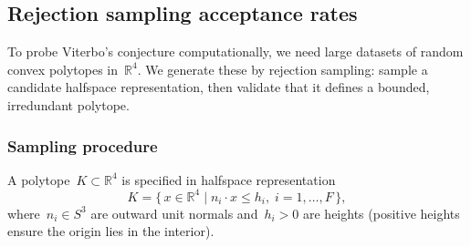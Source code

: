 %
%
%

\subsection{Rejection sampling acceptance rates}
\label{sec:rejection-sampling}

To probe Viterbo's conjecture computationally, we need large datasets of
random convex polytopes in~$\mathbb{R}^4$. We generate these by rejection
sampling: sample a candidate halfspace representation, then validate that it
defines a bounded, irredundant polytope.

\subsubsection*{Sampling procedure}

A polytope~$K \subset \mathbb{R}^4$ is specified in halfspace representation
\[
  K = \bigl\{\, x \in \mathbb{R}^4 \;\big|\; n_i \cdot x \le h_i,\;
  i = 1, \ldots, F \,\bigr\},
\]
where~$n_i \in S^3$ are outward unit normals and~$h_i > 0$ are heights
(positive heights ensure the origin lies in the interior).


